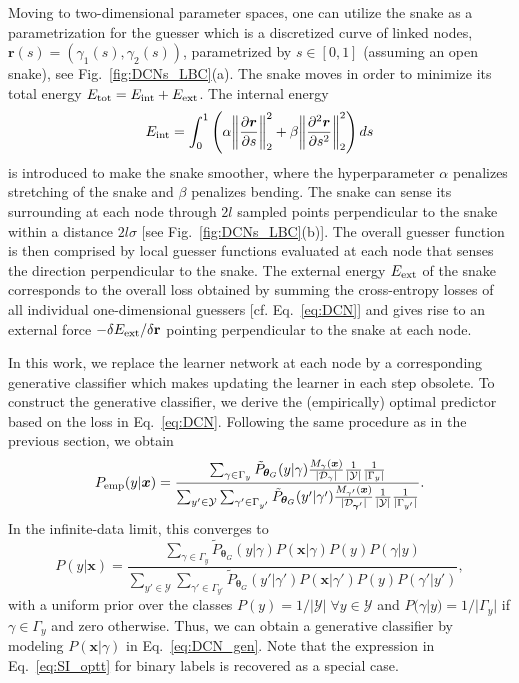 \indent Moving to two-dimensional parameter spaces, one can utilize the snake as a parametrization for the guesser which is a discretized curve of linked nodes, $\bm{r}(s)=\left(\gamma_{1}(s),\gamma_{2}(s)\right)$, parametrized by $s \in [0,1]$ (assuming an open snake), see Fig.~\ref{fig:DCNs_LBC}(a). The snake moves in order to minimize its total energy $E_{\rm tot}=E_{\rm int} + E_{\rm ext}$. The internal energy
\begin{equation}
    E_{\rm int} = \int_0^1\left(\alpha \norm{\frac{\partial \bm{r}}{\partial s}}_{2}^2+\beta\norm{\frac{\partial^2 \bm{r}}{\partial s^2}}_{2}^2\right) ds
\end{equation}
is introduced to make the snake smoother, where the hyperparameter $\alpha$ penalizes stretching of the snake and $\beta$ penalizes bending. The snake can sense its surrounding at each node through $2l$ sampled points perpendicular to the snake within a distance $2l \sigma$ [see Fig.~\ref{fig:DCNs_LBC}(b)]. The overall guesser function is then comprised by local guesser functions evaluated at each node that senses the direction perpendicular to the snake. The external energy $E_{\rm ext}$ of the snake corresponds to the overall loss obtained by summing the cross-entropy losses of all individual one-dimensional guessers [cf. Eq.~\eqref{eq:DCN}] and gives rise to an external force $-\delta E_{\rm ext}/\delta \mathbf{r}$ pointing perpendicular to the snake at each node.

\indent In this work, we replace the learner network at each node by a corresponding generative classifier which makes updating the learner in each step obsolete. To construct the generative classifier, we derive the (empirically) optimal predictor based on the loss in Eq.~\eqref{eq:DCN}. Following the same procedure as in the previous section, we obtain 
\begin{equation}
    P_{\rm emp}(y|\bm{x}) = \frac{\sum_{\gamma \in \Gamma_{y}} \tilde{P}_{\bm{\theta}_{G}}(y|\gamma) \frac{M_{\gamma}(\bm{x})}{|\mathcal{D}_{\gamma}|} \frac{1}{|\mathcal{Y}|}\frac{1}{|\Gamma_{y}|}}{\sum_{y' \in \mathcal{Y}} \sum_{\gamma' \in \Gamma_{y'}} \tilde{P}_{\bm{\theta}_{G}}(y'|\gamma') \frac{M_{\gamma'}(\bm{x})}{|\mathcal{D}_{\bm{\gamma}'}|} \frac{1}{|\mathcal{Y}|}\frac{1}{|\Gamma_{y'}|}}.
\end{equation}
In the infinite-data limit, this converges to 
\begin{equation}\label{eq:DCN_gen}
    P(y|\bm{x}) = \frac{\sum_{\gamma \in \Gamma_{y}} \tilde{P}_{\bm{\theta}_{G}}(y|\gamma)P(\bm{x}|\gamma)P(y)P(\gamma|y)}{\sum_{y'\in \mathcal{Y}} \sum_{\gamma' \in \Gamma_{y'}}\tilde{P}_{\bm{\theta}_{G}}(y'|\gamma')P(\bm{x}|\gamma')P(y)P(\gamma'|y')},
\end{equation}
with a uniform prior over the classes $P(y) = 1/|\mathcal{Y}|\; \forall y \in \mathcal{Y}$ and $P(\gamma|y) = 1/|\Gamma_{y}|$ if $\gamma \in \Gamma_{y}$ and zero otherwise. Thus, we can obtain a generative classifier by modeling $P(\bm{x}|\gamma)$ in Eq.~\eqref{eq:DCN_gen}. Note that the expression in Eq.~\eqref{eq:SI_optt} for binary labels is recovered as a special case.\\

